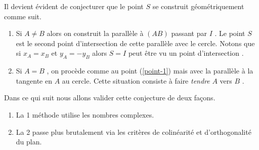 Il devient évident de conjecturer que le point $S$ se construit géométriquement comme suit.

\begin{enumerate}
	\item \label{point-1} Si $A \neq B$ alors on construit la parallèle à $(AB)$ passant par $I$ . Le point $S$ est le second point d'intersection de cette parallèle avec le cercle.
	Notons que si $x_A = x_B$ et $y_A = -y_B$ alors $S = I$ peut être vu un point d'intersection .

	\item Si $A = B$ , on procède comme au point (\ref{point-1}) mais avec la parallèle à la tangente en $A$ au cercle. Cette situation consiste à faire \emph{\og tendre \fg} $A$ vers $B$ .
\end{enumerate}


\medskip

Dans ce qui suit nous allons valider cette conjecture de deux façons.

\begin{enumerate}
	\item La 1\iere{} méthode utilise les nombres complexes.
	
	\item La 2\ieme{} passe plus brutalement via les critères de colinéarité et d'orthogonalité du plan.
\end{enumerate}
